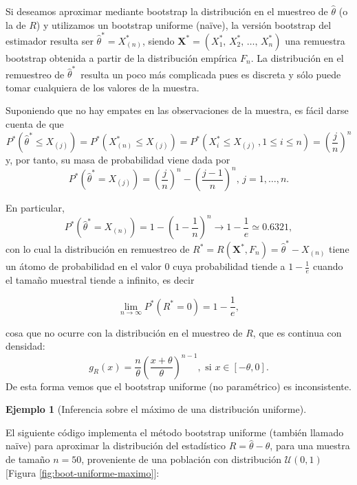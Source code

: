 \documentclass[
]{book}
\theoremstyle{break}
\theoremstyle{definition}
\theoremstyle{definition}
\newtheorem{example}{Ejemplo}[chapter]
\theoremstyle{definition}
\theoremstyle{definition}
\theoremstyle{remark}
\begin{document}
Si deseamos aproximar mediante bootstrap la distribución en el muestreo
de \(\hat{\theta}\) (o la de \(R\)) y utilizamos un bootstrap uniforme
(naïve), la versión bootstrap del estimador resulta ser
\(\hat{\theta}^{\ast }=X_{(n)}^{\ast}\), siendo
\(\mathbf{X}^{\ast}=\left( X_1^{\ast}\text{, }X_2^{\ast}\text{, }\ldots \text{, }X_n^{\ast } \right)\) una remuestra bootstrap obtenida a partir de la distribución
empírica \(F_n\). La distribución en el remuestreo de \(\hat{\theta} ^{\ast}\,\) resulta un poco más complicada pues es discreta y sólo puede
tomar cualquiera de los valores de la muestra.

Suponiendo que no hay empates en las observaciones de la muestra, es
fácil darse cuenta de que
\[P^{\ast}\left( \hat{\theta}^{\ast}\leq X_{(j)} \right)
=P^{\ast}\left( X_{(n)}^{\ast}\leq X_{(j)
} \right) =P^{\ast}\left( X_i^{\ast}\leq X_{(j)}\,,
 1 \leq i \leq n \right) =\left( \frac{j}{n} \right)^{n}\]
y, por tanto, su masa de probabilidad viene dada por
\[P^{\ast}\left( \hat{\theta}^{\ast}=X_{(j)} \right) =\left( 
\frac{j}{n} \right)^{n}-\left( \frac{j-1}{n} \right)^{n}\text{, }j=1,\ldots,n.\]

En particular,
\[P^{\ast}\left( \hat{\theta}^{\ast}=X_{(n)} \right) =1-\left( 1-
\frac{1}{n} \right)^{n}\rightarrow 1-\frac{1}{e}\simeq 0.6321,\]
con lo cual la distribución en remuestreo de \(R^{\ast}=R\left( \mathbf{X}^{\ast},F_n \right) =\hat{\theta}^{\ast}-X_{\left( n \right)}\) tiene un átomo de probabilidad en el valor \(0\) cuya
probabilidad tiende a \(1-\frac{1}{e}\) cuando el tamaño muestral tiende a
infinito, es decir

\[\lim_{n\rightarrow \infty }P^{\ast}\left( R^{\ast}=0 \right) =1-\frac{1}{e},\]

cosa que no ocurre con la distribución en el muestreo de \(R\), que es continua
con densidad:
\[g_R\left( x \right) =\frac{n}{\theta }\left( \frac{x + \theta}{\theta } \right)^{n-1},
\text{ si }x\in \left[ -\theta, 0\right].\]
De esta forma vemos que el bootstrap uniforme (no paramétrico) es inconsistente.

\begin{example}[Inferencia sobre el máximo de una distribución uniforme]
\protect\hypertarget{exm:boot-maximo-uniforme}{}{\label{exm:boot-maximo-uniforme} \iffalse (Inferencia sobre el máximo de una distribución uniforme) \fi{} }
\end{example}

El siguiente código implementa el método
bootstrap uniforme (también llamado naïve) para aproximar la
distribución del estadístico \(R=\hat{\theta}-\theta\), para una muestra
de tamaño \(n=50\), proveniente de una población con distribución
\(\mathcal{U}\left( 0,1\right)\) {[}Figura \ref{fig:boot-uniforme-maximo}{]}:
\end{document}
